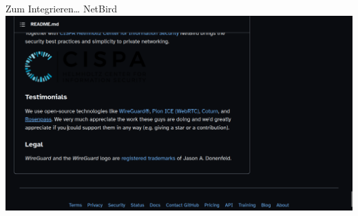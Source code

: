 \documentclass[german]{rosenpass-beamer}
\begin{document}
\begin{frame}{Zum Integrieren… NetBird}
  \includegraphics[height=.9\textheight]{assets/2023-09-02-netbird-gh-rosenpass-testemonial.png}
\end{frame}
\end{document}
